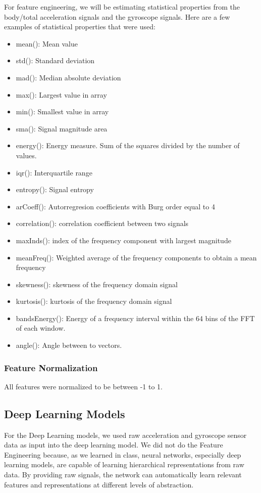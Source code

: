 \documentclass[11pt]{article}
\begin{document}
For feature engineering, we will be estimating statistical properties from the body/total acceleration signals and the gyroscope signals. Here are a few examples of statistical properties that were used:
\begin{itemize}
    \item mean(): Mean value
    \item std(): Standard deviation
    \item mad(): Median absolute deviation 
    \item max(): Largest value in array
    \item min(): Smallest value in array
    \item sma(): Signal magnitude area
    \item energy(): Energy measure. Sum of the squares divided by the number of values. 
    \item iqr(): Interquartile range 
    \item entropy(): Signal entropy
    \item arCoeff(): Autorregresion coefficients with Burg order equal to 4
    \item correlation(): correlation coefficient between two signals
    \item maxInds(): index of the frequency component with largest magnitude
    \item meanFreq(): Weighted average of the frequency components to obtain a mean frequency
    \item skewness(): skewness of the frequency domain signal 
    \item kurtosis(): kurtosis of the frequency domain signal 
    \item bandsEnergy(): Energy of a frequency interval within the 64 bins of the FFT of each window.
    \item angle(): Angle between to vectors.
\end{itemize}

\subsubsection{Feature Normalization}
All features were normalized to be between -1 to 1. 

\subsection{Deep Learning Models}
For the Deep Learning models, we used raw acceleration and gyroscope sensor data as input into the deep learning model. We did not do the Feature Engineering because, as we learned in class, neural networks, especially deep learning models, are capable of learning hierarchical representations from raw data. By providing raw signals, the network can automatically learn relevant features and representations at different levels of abstraction.
\end{document}

